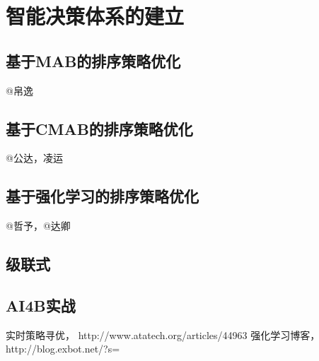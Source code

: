 
\chapter{ 智能决策体系的建立 }
\thispagestyle{empty}

\setlength{\fboxrule}{0pt}\setlength{\fboxsep}{0cm}
\noindent\shadowbox{
\begin{tcolorbox}[arc=0mm,colback=lightblue,colframe=darkblue,title=学习目标与要求]

\end{tcolorbox}}
\setlength{\fboxrule}{1pt}\setlength{\fboxsep}{4pt} 




\section{ 基于MAB的排序策略优化 } 
	@帛逸

\section{ 基于CMAB的排序策略优化 } 
	@公达，凌运

\section{ 基于强化学习的排序策略优化 } 
	@哲予，@达卿

\section{ 级联式 }

\section{AI4B实战} 


\begin{thebibliography}{99}
 实时策略寻优， http://www.atatech.org/articles/44963
 强化学习博客，http://blog.exbot.net/?s=%
\end{thebibliography}

 
